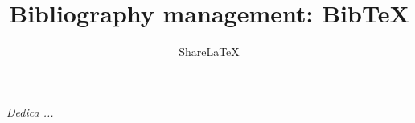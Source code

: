 \documentclass[a4paper,10pt]{book}
\title{Bibliography management: BibTeX}
\author{Share\LaTeX}
\begin{document}
\frontmatter
\maketitle
\newpage
\begin{flushright}%
  \emph{Dedica ...}
  \thispagestyle{empty}
\end{flushright}


\tableofcontents
\listoffigures

\medskip
\mainmatter





\medskip



\end{document}
